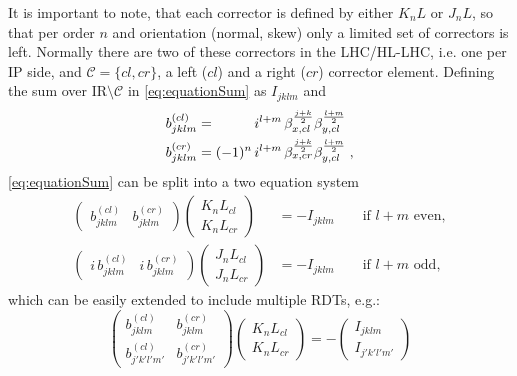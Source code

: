 It is important to note, that each corrector is defined by either
$K_nL$ or $J_nL$, so that per order $n$ and orientation (normal, skew) only a limited set of 
correctors is left.
Normally there are two of these correctors in the LHC/HL-LHC, i.e. one per IP side,
and $\mathcal{C} = \{cl, cr\}$, a left ($cl$) and a right ($cr$) corrector element.
Defining the sum over IR$\setminus\mathcal{C}$ in \cref{eq:equationSum}
as $I_{jklm}$ and
\begin{equation}
    \label{eq:BcomponentsDef}
    \begin{split}
    b_{jklm}^{(cl)} &= 
     \hphantom{(-1)^n} \, i^{l+m} \,
     \beta_{x,cl} ^{\frac{j+k}{2}} \beta_{y,cl}^{\frac{l+m}{2}} 
    \\
    b_{jklm}^{(cr)} &= 
     (-1)^n\, i^{l+m} \, 
     \beta_{x,cr} ^{\frac{j+k}{2}} \beta_{y,cl}^{\frac{l+m}{2}} \; ,
    \end{split}
\end{equation}
%
\cref{eq:equationSum} can be split into a two equation system 
%
\begin{equation}
    \label{eq:linearEqSystemSingle}
    \begin{split}
        \begin{pmatrix}
            b_{jklm}^{(cl)} & b_{jklm}^{(cr)}
        \end{pmatrix}
        \begin{pmatrix}
            K_{n}L_{cl} \\ 
            K_{n}L_{cr}
        \end{pmatrix}
        &= - I_{jklm}
        \qquad \text{if } l+m \text{ even},
        \\
        \begin{pmatrix}
            i \, b_{jklm}^{(cl)} & i \, b_{jklm}^{(cr)}
        \end{pmatrix}
        \begin{pmatrix}
            J_{n}L_{cl} \\ 
            J_{n}L_{cr}
        \end{pmatrix}
        &= - I_{jklm}
        \qquad  \text{if } l+m \text{ odd}, 
    \end{split}
\end{equation}
%
which can be easily extended to include multiple RDTs, e.g.:
\begin{equation}    
    \label{eq:linearEqSystemDouble}
        \begin{pmatrix}
            b_{jklm}^{(cl)} & b_{jklm}^{(cr)} \\
            b_{j'k'l'm'}^{(cl)} & b_{j'k'l'm'}^{(cr)}
        \end{pmatrix}
        \begin{pmatrix}
            K_{n}L_{cl} \\ 
            K_{n}L_{cr}
        \end{pmatrix}
        = - 
        \begin{pmatrix}
            I_{jklm} \\ 
            I_{j'k'l'm'} 
        \end{pmatrix}
\end{equation}
